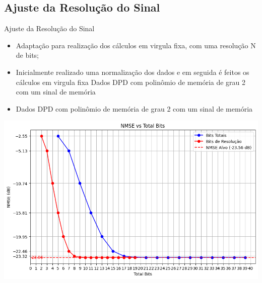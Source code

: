 \documentclass{if-beamer}
\begin{document}
\subsection{Ajuste da Resolução do Sinal}
\begin{frame}{Ajuste da Resolução do Sinal}
	\begin{minipage}{0.5\textwidth}
		\begin{itemize}
			\item Adaptação para realização dos cálculos em virgula fixa, com uma resolução N de bits;
			\item Inicialmente realizado uma normalização dos dados e em seguida é feitos os cálculos em virgula fixa Dados DPD com polinômio de memória de grau 2 com um sinal de memória
			\item  Dados DPD com polinômio 	de memória de grau 2 com 
			um sinal de memória
		\end{itemize}
	
		
	\end{minipage}%
	\hspace{0.04\textwidth}
	\begin{minipage}{0.5\textwidth}
	\includegraphics[scale=0.25]{bits.png}
	\end{minipage}
\end{frame}
\end{document}
